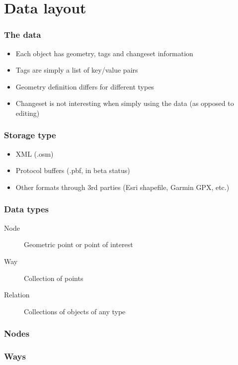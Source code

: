 \documentclass[14pt]{beamer}
\begin{document}
\section{Data layout}

\begin{frame}
  \frametitle{The data}
  \begin{itemize}
  \item Each object has geometry, tags and changeset information
  \item Tags are simply a list of key/value pairs
  \item Geometry definition differs for different types
  \item Changeset is not interesting when simply using the
    data (as opposed to editing)
  \end{itemize}
\end{frame}

\begin{frame}
  \frametitle{Storage type}
  \begin{itemize}
  \item XML (.osm)
  \item Protocol buffers (.pbf, in beta status)
  \item Other formats through 3rd parties
    (Esri shapefile, Garmin GPX, etc.)
  \end{itemize}
\end{frame}

\begin{frame}
  \frametitle{Data types}
  \begin{description}
  \item[Node] Geometric point or point of interest
  \item[Way] Collection of points
  \item[Relation] Collections of objects of any type
  \end{description}
\end{frame}

\begin{frame}
  \frametitle{Nodes}
\end{frame}

\begin{frame}
  \frametitle{Ways}
\end{frame}
\end{document}
